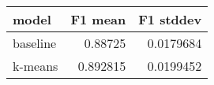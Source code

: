 \begin{tabular}{lrr}
\toprule
 model    &   F1 mean &   F1 stddev \\
\midrule
 baseline &  0.88725  &   0.0179684 \\
 k-means  &  0.892815 &   0.0199452 \\
\bottomrule
\end{tabular}